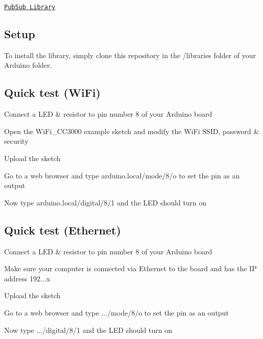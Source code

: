 \begin{DoxyItemize}
\item \href{https://github.com/knolleary/pubsubclient}{\tt Pub\+Sub Library}
\end{DoxyItemize}

\subsection*{Setup}

To install the library, simply clone this repository in the /libraries folder of your Arduino folder.

\subsection*{Quick test (Wi\+Fi)}


\begin{DoxyEnumerate}
\item Connect a L\+ED \& resistor to pin number 8 of your Arduino board
\item Open the Wi\+Fi\+\_\+\+C\+C3000 example sketch and modify the Wi\+Fi S\+S\+ID, password \& security
\item Upload the sketch
\item Go to a web browser and type {\ttfamily arduino.\+local/mode/8/o} to set the pin as an output
\item Now type {\ttfamily arduino.\+local/digital/8/1} and the L\+ED should turn on
\end{DoxyEnumerate}

\subsection*{Quick test (Ethernet)}


\begin{DoxyEnumerate}
\item Connect a L\+ED \& resistor to pin number 8 of your Arduino board
\item Make sure your computer is connected via Ethernet to the board and has the IP address 192...\+x
\item Upload the sketch
\item Go to a web browser and type {.../mode/8/o} to set the pin as an output
\item Now type {.../digital/8/1} and the L\+ED should turn on
\end{DoxyEnumerate}

